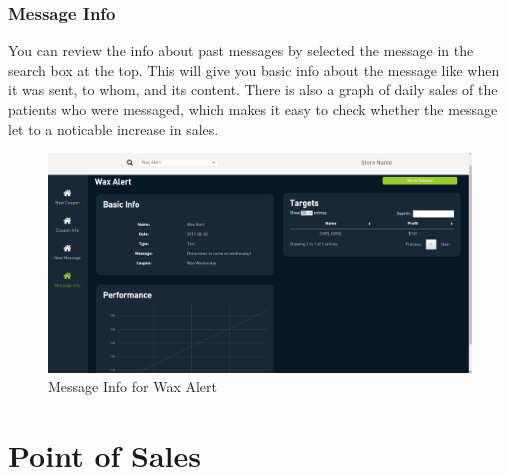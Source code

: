 \documentclass[]{book}
\theoremstyle{definition}
\theoremstyle{definition}
\theoremstyle{definition}
\theoremstyle{remark}
\begin{document}
\subsection{Message Info}\label{message-info}

You can review the info about past messages by selected the message in
the search box at the top. This will give you basic info about the
message like when it was sent, to whom, and its content. There is also a
graph of daily sales of the patients who were messaged, which makes it
easy to check whether the message let to a noticable increase in sales.

\begin{figure}
\centering
\includegraphics{images/C7.png}
\caption{Message Info for Wax Alert}
\end{figure}

\chapter{Point of Sales}\label{point-of-sales}
\end{document}
